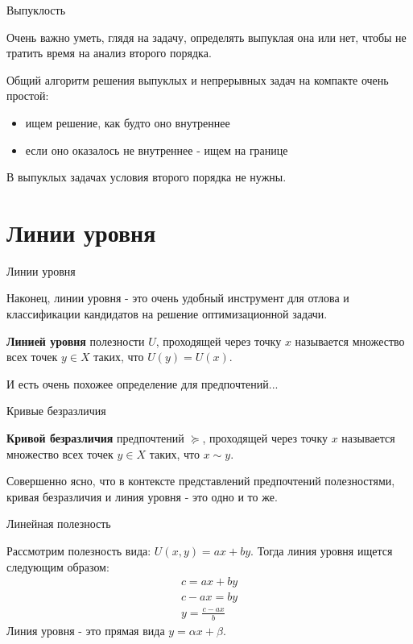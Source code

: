 \documentclass{beamer}
\begin{document}
\begin{frame}{Выпуклость}

Очень важно уметь, глядя на задачу, определять выпуклая она или нет, чтобы не тратить время на анализ второго порядка. 

Общий алгоритм решения выпуклых и непрерывных задач на компакте очень простой:

\begin{itemize}
\item ищем решение, как будто оно внутреннее
\item если оно оказалось не внутреннее - ищем на границе
\end{itemize}

В выпуклых задачах условия второго порядка не нужны.

\end{frame}

\section{Линии уровня}

\begin{frame}{Линии уровня}

Наконец, линии уровня - это очень удобный инструмент для отлова и классификации кандидатов на решение оптимизационной задачи.

\begin{definition}
\textbf{Линией уровня} полезности $U$, проходящей через точку $x$ называется множество всех точек $y \in X$ таких, что $U(y) = U(x)$.
\end{definition}

И есть очень похожее определение для предпочтений...

\end{frame}

\begin{frame}{Кривые безразличия}

\begin{definition}
\textbf{Кривой безразличия} предпочтений $\succcurlyeq$, проходящей через точку $x$ называется множество всех точек $y \in X$ таких, что $x \sim y$.
\end{definition}

Совершенно ясно, что в контексте представлений предпочтений полезностями, кривая безразличия и линия уровня - это одно и то же.

\end{frame}

\begin{frame}{Линейная полезность}

Рассмотрим полезность вида: $U(x, y) = ax + by$. Тогда линия уровня ищется следующим образом: 
\begin{gather*}
c = ax + by\\
c-ax = by\\
y = \frac{c-ax}{b}
\end{gather*}
Линия уровня - это прямая вида $y = \alpha x + \beta$.

\end{frame}
\end{document}
